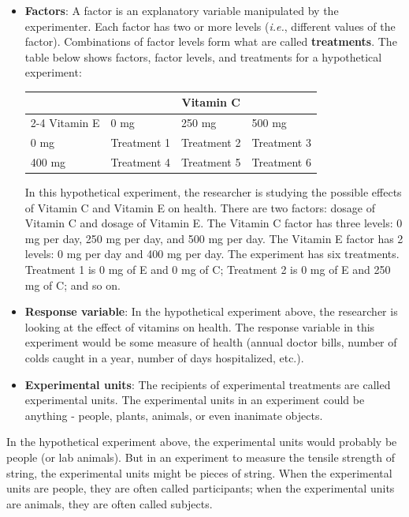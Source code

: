 \documentclass[
]{book}
\begin{document}
\begin{itemize}
\item
  \textbf{Factors}: A factor is an explanatory variable manipulated by the experimenter. Each factor has two or more levels (\emph{i.e.}, different values of the factor). Combinations of factor levels form what are called \textbf{treatments}. The table below shows factors, factor levels, and treatments for a hypothetical experiment:

  \begin{table}
  \centering
  \begin{tabular}{l|l|l|l}
  \hline
  \multicolumn{1}{c|}{ } & \multicolumn{3}{c}{Vitamin C} \\
  \cline{2-4}
  Vitamin E & 0 mg & 250 mg & 500 mg\\
  \hline
  0 mg & Treatment 1 & Treatment 2 & Treatment 3\\
  \hline
  400 mg & Treatment 4 & Treatment 5 & Treatment 6\\
  \hline
  \end{tabular}
  \end{table}

  In this hypothetical experiment, the researcher is studying the possible effects of Vitamin C and Vitamin E on health.
  There are two factors: dosage of Vitamin C and dosage of Vitamin E.
  The Vitamin C factor has three levels: 0 mg per day, 250 mg per day, and 500 mg per day.
  The Vitamin E factor has 2 levels: 0 mg per day and 400 mg per day.
  The experiment has six treatments.
  Treatment 1 is 0 mg of E and 0 mg of C; Treatment 2 is 0 mg of E and 250 mg of C; and so on.
\item
  \textbf{Response variable}: In the hypothetical experiment above, the researcher is looking at the effect of vitamins on health. The response variable in this experiment would be some measure of health (annual doctor bills, number of colds caught in a year, number of days hospitalized, etc.).
\item
  \textbf{Experimental units}: The recipients of experimental treatments are called experimental units. The experimental units in an experiment could be anything - people, plants, animals, or even inanimate objects.
\end{itemize}

In the hypothetical experiment above, the experimental units would probably be people (or lab animals).
But in an experiment to measure the tensile strength of string, the experimental units might be pieces of string.
When the experimental units are people, they are often called participants; when the experimental units are animals, they are often called subjects.
\end{document}
